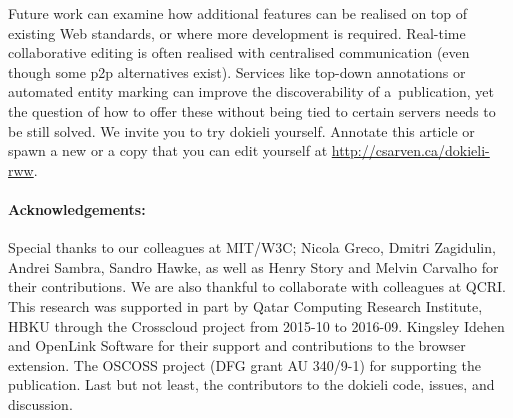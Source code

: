 \documentclass[a4paper]{llncs}
\begin{document}
                            
\par 
                                Future work can examine how
                                additional features can be realised
                                on top of existing Web standards,
                                or where more development is required.
                                Real-time collaborative editing
                                is often realised with centralised communication
                                (even though some p2p alternatives exist).
                                Services like top-down annotations or automated entity marking
                                can improve the discoverability of a publication,
                                yet the question of how to offer these
                                without being tied to certain servers needs to be still solved. We invite you to try dokieli yourself. Annotate this article or spawn a new or a copy that you can edit yourself at \url{http://csarven.ca/dokieli-rww}.

                    
\paragraph{Acknowledgements:}
Special thanks to our colleagues at \empty MIT/\empty W3C; \empty Nicola Greco, \empty Dmitri Zagidulin, \empty Andrei Sambra, \empty Sandro Hawke, as well as \empty Henry Story and \empty Melvin Carvalho for their contributions. We are also thankful to collaborate with colleagues at \empty QCRI. This research was supported in part by \empty Qatar Computing Research Institute, \empty HBKU through the \empty Crosscloud project from 2015-10 to 2016-09. \empty Kingsley Idehen and \empty OpenLink Software for their support and contributions to the browser extension. The OSCOSS project (DFG grant AU 340/9-1) for supporting the publication.  Last but not least, the contributors to the dokieli code, issues, and discussion.
\end{document}
